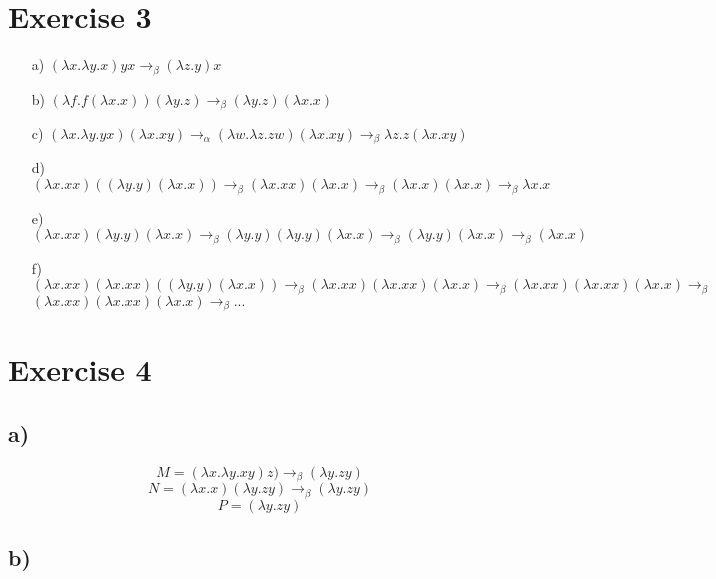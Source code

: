\documentclass[11pt]{article}
\begin{document}
\section{Exercise 3}
\begin{itemize}
  \item[a)] $(\lambda x.\lambda y.x) yx \to_\beta (\lambda z.y)x$
  \item[b)] $(\lambda f.f(\lambda x.x))(\lambda y.z) \to_\beta (\lambda
    y.z)(\lambda x.x)$
  \item[c)] $(\lambda x.\lambda y.yx)(\lambda x.xy) \to_\alpha (\lambda
    w.\lambda z.zw)(\lambda x.xy) \to_\beta \lambda z.z(\lambda x.xy)$
  \item[d)] $(\lambda x.xx)((\lambda y.y)(\lambda x.x)) \to_\beta (\lambda
    x.xx)(\lambda x.x) \to_\beta (\lambda x.x)(\lambda x.x) \to_\beta \lambda
    x.x$
  \item[e)] $(\lambda x.xx)(\lambda y.y)(\lambda x.x) \to_\beta (\lambda
    y.y)(\lambda y.y)(\lambda x.x) \to_\beta (\lambda y.y)(\lambda x.x)
    \to_\beta (\lambda x.x)$
  \item[f)] $(\lambda x.xx)(\lambda x.xx)((\lambda y.y)(\lambda x.x)) \to_\beta
    (\lambda x.xx)(\lambda x.xx)(\lambda x.x) \to_\beta (\lambda x.xx)(\lambda
    x.xx)(\lambda x.x) \to_\beta$
    $(\lambda x.xx)(\lambda x.xx)(\lambda x.x)
    \to_\beta ...$
\end{itemize}

\section{Exercise 4}
\subsection{a)}
$$ M = (\lambda x.\lambda y.xy)z) \to_\beta (\lambda y.zy)$$
$$ N = (\lambda x.x)(\lambda y.zy) \to_\beta (\lambda y.zy)$$
$$ P = (\lambda y.zy)$$

\subsection{b)}
\end{document}
